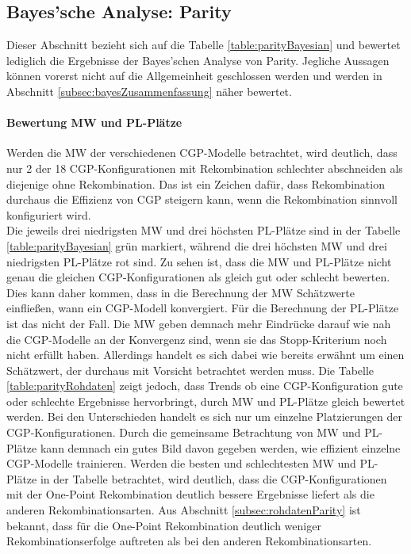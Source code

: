 
\subsection{Bayes'sche Analyse: Parity}
\label{subsec:bayesParity}

Dieser Abschnitt bezieht sich auf die Tabelle \ref{table:parityBayesian} und bewertet lediglich die Ergebnisse der Bayes'schen Analyse von Parity.
Jegliche Aussagen können vorerst nicht auf die Allgemeinheit geschlossen werden und werden in Abschnitt \ref{subsec:bayesZusammenfassung} näher bewertet.
\paragraph{Bewertung MW und PL-Plätze}
Werden die MW der verschiedenen CGP-Modelle betrachtet, wird deutlich, dass nur 2 der 18 CGP-Konfigurationen mit Rekombination schlechter abschneiden als diejenige ohne Rekombination.
Das ist ein Zeichen dafür, dass Rekombination durchaus die Effizienz von CGP steigern kann, wenn die Rekombination sinnvoll konfiguriert wird.\\
Die jeweils drei niedrigsten MW und drei höchsten PL-Plätze sind in der Tabelle \ref{table:parityBayesian} grün markiert, während die drei höchsten MW und drei niedrigsten PL-Plätze rot sind.
Zu sehen ist, dass die MW und PL-Plätze nicht genau die gleichen CGP-Konfigurationen als gleich gut oder schlecht bewerten.
Dies kann daher kommen, dass in die Berechnung der MW Schätzwerte einfließen, wann ein CGP-Modell konvergiert.
Für die Berechnung der PL-Plätze ist das nicht der Fall.
Die MW geben demnach mehr Eindrücke darauf wie nah die CGP-Modelle an der Konvergenz sind, wenn sie das Stopp-Kriterium noch nicht erfüllt haben.
Allerdings handelt es sich dabei wie bereits erwähnt um einen Schätzwert, der durchaus mit Vorsicht betrachtet werden muss.
Die Tabelle \ref{table:parityRohdaten} zeigt jedoch, dass Trends ob eine CGP-Konfiguration gute oder schlechte Ergebnisse hervorbringt, durch MW und PL-Plätze gleich bewertet werden.
Bei den Unterschieden handelt es sich nur um einzelne Platzierungen der CGP-Konfigurationen.
Durch die gemeinsame Betrachtung von MW und PL-Plätze kann demnach ein gutes Bild davon gegeben werden, wie effizient einzelne CGP-Modelle trainieren.
Werden die besten und schlechtesten MW und PL-Plätze in der Tabelle betrachtet, wird deutlich, dass die CGP-Konfigurationen mit der One-Point Rekombination deutlich bessere Ergebnisse liefert als die anderen Rekombinationsarten.
Aus Abschnitt \ref{subsec:rohdatenParity} ist bekannt, dass für die One-Point Rekombination deutlich weniger Rekombinationserfolge auftreten als bei den anderen Rekombinationsarten.
